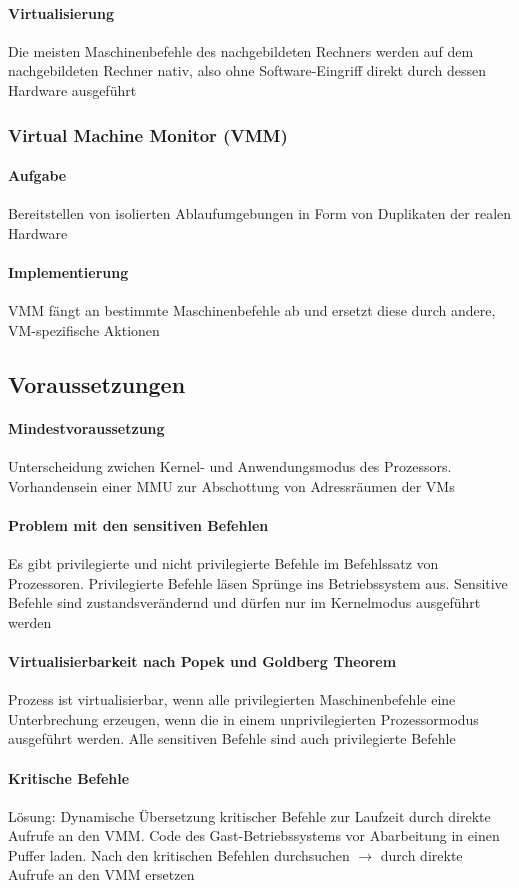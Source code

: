 \documentclass[11pt,a4paper,landscape]{article}
\begin{document}
\begin{multicols*}{3}
	\paragraph{Virtualisierung} Die meisten Maschinenbefehle des nachgebildeten Rechners werden auf dem nachgebildeten Rechner nativ, also ohne Software-Eingriff direkt durch dessen Hardware ausgeführt
	\subsubsection{Virtual Machine Monitor (VMM)}
	\paragraph{Aufgabe} Bereitstellen von isolierten Ablaufumgebungen in Form von Duplikaten der realen Hardware
	\paragraph{Implementierung} VMM fängt an bestimmte Maschinenbefehle ab und ersetzt diese durch andere, VM-spezifische Aktionen
	\subsection{Voraussetzungen}
	\paragraph{Mindestvoraussetzung} Unterscheidung zwichen Kernel- und Anwendungsmodus des Prozessors. Vorhandensein einer MMU zur Abschottung von Adressräumen der VMs
	\paragraph{Problem mit den sensitiven Befehlen} Es gibt privilegierte und nicht privilegierte Befehle im Befehlssatz von Prozessoren. Privilegierte Befehle läsen Sprünge ins Betriebssystem aus. Sensitive Befehle sind zustandsverändernd und dürfen nur im Kernelmodus ausgeführt werden
	\paragraph{Virtualisierbarkeit nach Popek und Goldberg Theorem} Prozess ist virtualisierbar, wenn alle privilegierten Maschinenbefehle eine Unterbrechung erzeugen, wenn die in einem unprivilegierten Prozessormodus ausgeführt werden. Alle sensitiven Befehle sind auch privilegierte Befehle
	\paragraph{Kritische Befehle} Lösung: Dynamische Übersetzung kritischer Befehle zur Laufzeit durch direkte Aufrufe an den VMM. Code des Gast-Betriebssystems vor Abarbeitung in einen Puffer laden. Nach den kritischen Befehlen durchsuchen $\rightarrow$ durch direkte Aufrufe an den VMM ersetzen

\end{multicols*}
\end{document}
